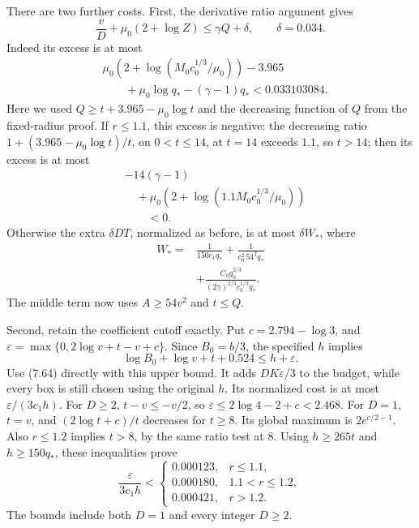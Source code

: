 \documentclass[
  11pt,
  a4paper,
]{article}
\begin{document}
There are two further costs. First, the derivative ratio argument gives
\[
\frac vD+\mu_0(2+\log Z)\le\gamma Q+\delta,
\qquad \delta=0.034.
\] Indeed its excess is at most \[
\begin{aligned}
&\mu_0\left(2+\log(M_0c_0^{1/3}/\mu_0)\right)-3.965\\
&\qquad+\mu_0\log q_*-(\gamma-1)q_*
<0.033103084.
\end{aligned}
\] Here we used \(Q\ge t+3.965-\mu_0\log t\) and the decreasing function
of \(Q\) from the fixed-radius proof. If \(r\le1.1\), this excess is
negative: the decreasing ratio \(1+(3.965-\mu_0\log t)/t\), on
\(0<t\le14\), at \(t=14\) exceeds \(1.1\), so \(t>14\); then its excess
is at most \[
\begin{aligned}
&-14(\gamma-1)\\
&\quad+\mu_0\left(2+\log(1.1M_0c_0^{1/3}/\mu_0)\right)\\
&\qquad<0.
\end{aligned}
\] Otherwise the extra \(\delta DT\), normalized as before, is at most
\(\delta W_*\), where \[
\begin{aligned}
W_*={}&\frac1{150c_1q_*}+
\frac1{c_0^2\,54^2q_*}\\
&+\frac{C_0g_0^{2/3}}{(2\gamma)^{2/3}c_0^{1/3}q_*}.
\end{aligned}
\] The middle term now uses \(A\ge54v^2\) and \(t\le Q\).

Second, retain the coefficient cutoff exactly. Put \(c=2.794-\log3\),
and \(\varepsilon=\max\{0,2\log v+t-v+c\}\). Since \(B_0=b/3\), the
specified \(h\) implies \[
\log B_0+\log v+t+0.524\le h+\varepsilon.
\] Use (7.64) directly with this upper bound. It adds
\(DK\varepsilon/3\) to the budget, while every box is still chosen using
the original \(h\). Its normalized cost is at most
\(\varepsilon/(3c_1h)\). For \(D\ge2\), \(t-v\le-v/2\), so
\(\varepsilon\le2\log4-2+c<2.468\). For \(D=1\), \(t=v\), and
\((2\log t+c)/t\) decreases for \(t\ge8\). Its global maximum is
\(2e^{c/2-1}\). Also \(r\le1.2\) implies \(t>8\), by the same ratio test
at \(8\). Using \(h\ge265t\) and \(h\ge150q_*\), these inequalities
prove \[
\frac{\varepsilon}{3c_1h}<
\begin{cases}
0.000123,&r\le1.1,\\
0.000180,&1.1<r\le1.2,\\
0.000421,&r>1.2.
\end{cases}
\] The bounds include both \(D=1\) and every integer \(D\ge2\).
\end{document}
